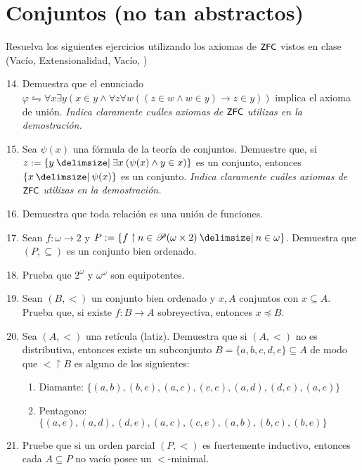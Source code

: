 \documentclass[11pt]{article}
\providecommand\st{\;|\;}
\newcommand\SetSymbol[1][]{%
    \nonscript\:#1\vert
    \allowbreak
    \nonscript\:
    \mathopen{}}
\renewcommand\st{\SetSymbol[\delimsize]}
\renewcommand\st{\SetSymbol[\delimsize]}
\newcommand{\zfc}{\text{\textsf{\small ZFC}}}
\begin{document}
    \section*{Conjuntos (no tan abstractos)}
    Resuelva los siguientes ejercicios utilizando los axiomas de $\zfc$ vistos en clase (Vacío, Extensionalidad, Vacío, )
    \begin{enumerate}[\bf\text{Ej.} 1.]
    \setcounter{enumi}{13}
    \item Demuestra que el enunciado $\varphi \leftrightharpoons \forall x\exists y (x\in y \wedge \forall z \forall w ((z\in w \wedge w\in y) \rightarrow z\in y))$ implica el axioma de unión.
    \textit{Indica claramente cuáles axiomas de $\zfc$ utilizas en la demostración.}

    \item Sea $\psi(x)$ una fórmula de la teoría de conjuntos. Demuestre que, si $z:=\{ y \st \exists x \: (\psi(x) \land y \in x) \}$ es un conjunto, entonces $\{x \st \psi(x)\}$ es un conjunto.
    \textit{Indica claramente cuáles axiomas de $\zfc$ utilizas en la demostración.}

   
    \item Demuestra que toda relación es una unión de funciones.
    \item Sean $f:\omega \to 2$ y $P:=\{ f \upharpoonright n \in \mathscr{P}(\omega \times 2) \st n \in \omega \}$. Demuestra que $(P,\subseteq)$ es un conjunto bien ordenado.
    

    \item Prueba que $2^\omega$ y $\omega ^ \omega$ son equipotentes.
    
    \item Sean $(B,<)$ un conjunto bien ordenado y $x,A$ conjuntos con $x \subseteq A$. Prueba que, si existe $f:B \to A$ sobreyectiva, entonces $x \preccurlyeq B$.
    

    \item Sea $(A,<)$ una retícula (latiz). Demuestra que si $(A,<)$ no es distributiva, entonces existe un subconjunto $B=\{a,b,c,d,e\} \subseteq A$ de modo que $< \upharpoonright B$ es alguno de los siguientes:
    \begin{enumerate}
        \item Diamante: $\{(a,b),(b,e),(a,c),(c,e),(a,d),(d,e),(a,e)\}$
        \item Pentagono: $\{(a,e),(a,d),(d,e),(a,c),(c,e),(a,b),(b,c),(b,e)\}$
    \end{enumerate}

    \item Pruebe que si un orden parcial $(P,<)$ es fuertemente inductivo, entonces cada $A \subseteq P$ no vacío posee un $<$-minimal.
    

\end{enumerate}
\end{document}
